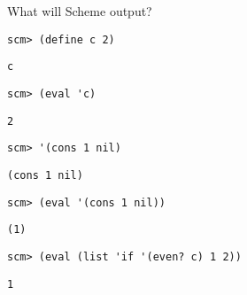 \begin{blocksection}
\question What will Scheme output?

\begin{lstlisting}
scm> (define c 2)
\end{lstlisting}
\begin{solution}[0.25in]
\begin{lstlisting}
c
\end{lstlisting}
\end{solution}

\begin{lstlisting}
scm> (eval 'c)
\end{lstlisting}
\begin{solution}[0.25in]
\begin{lstlisting}
2
\end{lstlisting}
\end{solution}

\begin{lstlisting}
scm> '(cons 1 nil)
\end{lstlisting}
\begin{solution}[0.25in]
\begin{lstlisting}
(cons 1 nil)
\end{lstlisting}
\end{solution}

\begin{lstlisting}
scm> (eval '(cons 1 nil))
\end{lstlisting}
\begin{solution}[0.25in]
\begin{lstlisting}
(1)
\end{lstlisting}
\end{solution}

\begin{lstlisting}
scm> (eval (list 'if '(even? c) 1 2))
\end{lstlisting}
\begin{solution}[0.25in]
\begin{lstlisting}
1
\end{lstlisting}
\end{solution}
\end{blocksection}

